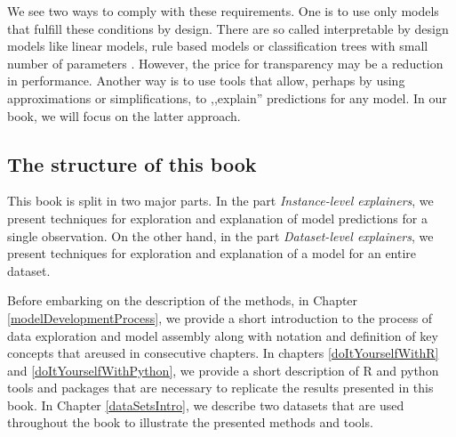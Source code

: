\documentclass[12pt,]{krantz}
\begin{document}
We see two ways to comply with these requirements. One is to use only models that fulfill these conditions by design. There are so called interpretable by design models like linear models, rule based models or classification trees with small number of parameters \citep{molnar2019}. However, the price for transparency may be a reduction in performance. Another way is to use tools that allow, perhaps by using approximations or simplifications, to ,,explain'' predictions for any model. In our book, we will focus on the latter approach.

\hypertarget{bookstructure}{%
\subsection{The structure of this book}\label{bookstructure}}

This book is split in two major parts. In the part \emph{Instance-level explainers}, we present techniques for exploration and explanation of model predictions for a single observation. On the other hand, in the part \emph{Dataset-level explainers}, we present techniques for exploration and explanation of a model for an entire dataset.

Before embarking on the description of the methods, in Chapter
\ref{modelDevelopmentProcess}, we provide a short introduction to the process of data exploration and model assembly along with notation and definition of key concepts that areused in consecutive chapters.
In chapters \ref{doItYourselfWithR} and \ref{doItYourselfWithPython}, we provide a short description of R and python tools and packages that are necessary to replicate the results presented in this book. In Chapter \ref{dataSetsIntro}, we describe two datasets that are used throughout the book to illustrate the presented methods and tools.
\end{document}
